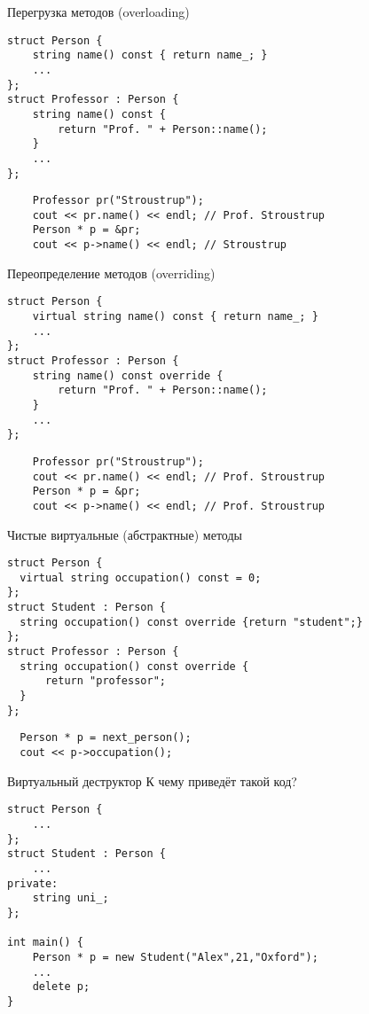 \documentclass{beamer}
\begin{document}
\begin{frame}[fragile]{Перегрузка методов (overloading)}
    \begin{lstlisting}
struct Person {
    string name() const { return name_; }
    ...
};
struct Professor : Person {
    string name() const { 
        return "Prof. " + Person::name();
    }
    ...
};
    \end{lstlisting}

\begin{lstlisting}
    Professor pr("Stroustrup");
    cout << pr.name() << endl; // Prof. Stroustrup
    Person * p = &pr;
    cout << p->name() << endl; // Stroustrup 
\end{lstlisting}
\end{frame}

\begin{frame}[fragile]{Переопределение методов (overriding)}
    \begin{lstlisting}
struct Person {
    virtual string name() const { return name_; }
    ...
};
struct Professor : Person {
    string name() const override {
        return "Prof. " + Person::name();
    }
    ...
};
    \end{lstlisting}

\begin{lstlisting}
    Professor pr("Stroustrup");
    cout << pr.name() << endl; // Prof. Stroustrup
    Person * p = &pr;
    cout << p->name() << endl; // Prof. Stroustrup 
\end{lstlisting}
\end{frame}

\begin{frame}[fragile]{Чистые виртуальные (абстрактные) методы}
    \begin{lstlisting}
struct Person {
  virtual string occupation() const = 0;
};
struct Student : Person {
  string occupation() const override {return "student";}
};
struct Professor : Person {
  string occupation() const override {
      return "professor";
  }
};
\end{lstlisting}
\begin{lstlisting}
  Person * p = next_person();
  cout << p->occupation(); 
\end{lstlisting}
\end{frame}

\begin{frame}[fragile]{Виртуальный деструктор}
К чему приведёт такой код?
    \begin{lstlisting}
struct Person {
    ...
};
struct Student : Person {
    ...
private:
    string uni_;
};

int main() {
    Person * p = new Student("Alex",21,"Oxford");
    ...
    delete p;
}
    \end{lstlisting}
\end{frame}
\end{document}
